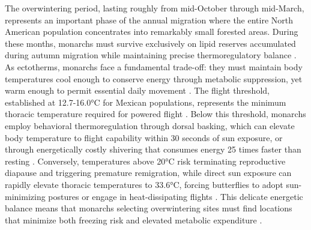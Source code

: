 The overwintering period, lasting roughly from mid-October through mid-March, represents an important phase of the annual migration where the entire North American population concentrates into remarkably small forested areas. During these months, monarchs must survive exclusively on lipid reserves accumulated during autumn migration while maintaining precise thermoregulatory balance \citep{chaplinEnergyReservesMetabolic1982,mastersMonarchButterflyDanaus1988}. As ectotherms, monarchs face a fundamental trade-off: they must maintain body temperatures cool enough to conserve energy through metabolic suppression, yet warm enough to permit essential daily movement \citep{mastersMonarchButterflyDanaus1988}. The flight threshold, established at 12.7-16.0°C for Mexican populations, represents the minimum thoracic temperature required for powered flight \citep{mastersMonarchButterflyDanaus1988}. Below this threshold, monarchs employ behavioral thermoregulation through dorsal basking, which can elevate body temperature to flight capability within 30 seconds of sun exposure, or through energetically costly shivering that consumes energy 25 times faster than resting \citep{mastersMonarchButterflyDanaus1988}. Conversely, temperatures above 20°C risk terminating reproductive diapause and triggering premature remigration, while direct sun exposure can rapidly elevate thoracic temperatures to 33.6°C, forcing butterflies to adopt sun-minimizing postures or engage in heat-dissipating flights \citep{barkerEffectPhotoperiodTemperature1976,barkerEffectPhotoperiodTemperature1976}. This delicate energetic balance means that monarchs selecting overwintering sites must find locations that minimize both freezing risk and elevated metabolic expenditure \citep{mastersMonarchButterflyDanaus1988}.

